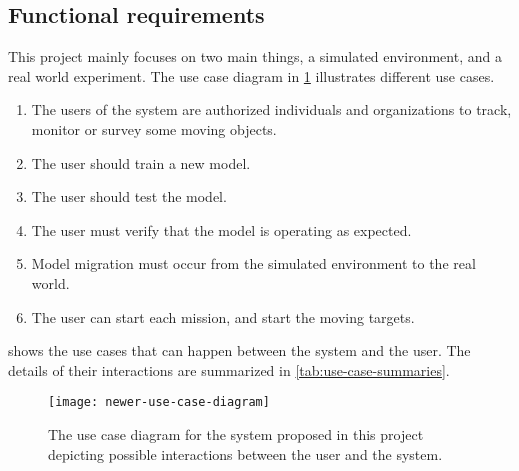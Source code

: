 \documentclass[../main.tex]{subfiles}
\begin{document}
\subsection{Functional requirements}

This project mainly focuses on two main things, a simulated environment, and 
a real world experiment. The use case diagram in \cref{fig:use-case-diagram} illustrates different use cases.

\begin{enumerate}
    \item The users of the system are authorized
        individuals and organizations to track, monitor or survey
        some moving objects.
    \item The user should train a new model.
    \item The user should test the model.
    \item The user must verify that the model is operating as expected.
    \item Model migration must occur from the simulated environment to the 
    real world.
    \item The user can start each mission, and start the moving targets.
\end{enumerate}









 shows the use cases that can
happen between the system and the user. The details of their
interactions are summarized in \cref{tab:use-case-summaries}.

\begin{figure}[tbp] 
    \centering
    \texttt{[image: newer-use-case-diagram]} 
    \caption{The use case diagram for the system proposed 
            in this project depicting possible interactions 
            between the user and the system.}
    \label{fig:use-case-diagram} 
\end{figure}
\end{document}
